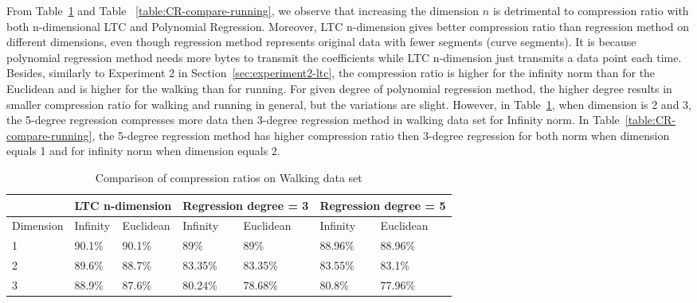 From Table~\ref{table:CR-compare-walking} and Table
~\ref{table:CR-compare-running}, we observe that increasing the dimension $n$ is
detrimental to compression ratio with both n-dimensional LTC and Polynomial
Regression. Moreover, LTC n-dimension gives better compression ratio than
regression method on different dimensions, even though regression method
represents original data with fewer segments (curve segments). It is because
polynomial regression method needs more bytes to transmit the coefficients while
LTC n-dimension just transmits a data point each time.
Besides, similarly to Experiment 2 in Section~\ref{sec:experiment2-ltc}, the
compression ratio is higher for the infinity norm than for the Euclidean and is
higher for the walking than for running. For given degree of polynomial
regression method, the higher degree results in smaller compression ratio for
walking and running in general, but the variations are slight. However, in
Table~\ref{table:CR-compare-walking}, when dimension is 2 and 3, the 5-degree
regression compresses more data then 3-degree regression method in walking data
set for Infinity norm.  In Table~\ref{table:CR-compare-running}, the 5-degree
regression method has higher compression ratio then 3-degree regression for both
norm when dimension equals 1 and for infinity norm when dimension equals 2.



\begin{table}
\begin{tabular}{|l|l|l|l|l|l|l|l|}
\hline
           & \multicolumn{2}{c|}{LTC n-dimension} & \multicolumn{2}{c|}{Regression degree = 3} & \multicolumn{3}{l|}{Regression degree = 5}\\ \hline
Dimension & Infinity   & Euclidean   & Infinity    & Euclidean     & Infinity      & \multicolumn{2}{l|}{Euclidean} \\ \hline
1          & 90.1\%     & 90.1\%      & 89\%        & 89\%          & 88.96\%       & \multicolumn{2}{l|}{88.96\%}   \\ \hline
2          & 89.6\%     & 88.7\%      & 83.35\%     & 83.35\%       & 83.55\%       & \multicolumn{2}{l|}{83.1\%}    \\ \hline
3          & 88.9\%     & 87.6\%      & 80.24\%     & 78.68\%       & 80.8\%        & \multicolumn{2}{l|}{77.96\%}   \\ \hline
\end{tabular}
\caption{Comparison of compression ratios on Walking data set}
\label{table:CR-compare-walking}
\end{table}


